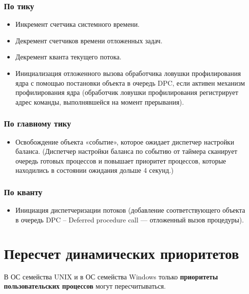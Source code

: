 \subsection*{По тику}
\begin{itemize}
	\item Инкремент счетчика системного времени.
	\item Декремент счетчиков времени отложенных задач.
	\item Декремент кванта текущего потока. %
	\item Инициализация отложенного вызова обработчика ловушки профилирования ядра с помощью постановки объекта в очередь DPC, если активен механизм профилирования ядра (обработчик ловушки профилирования регистрирует адрес команды, выполнявшейся на момент прерывания).
\end{itemize}

\subsection*{По главному тику}
\begin{itemize}
	\item Освобождение объекта «событие», которое ожидает диспетчер настройки баланса. (Диспетчер настройки баланса по событию от таймера сканирует очередь готовых процессов и повышает приоритет процессов, которые находились в состоянии ожидания дольше 4 секунд.)
\end{itemize}

\subsection*{По кванту}
\begin{itemize}
	\item Инициация диспетчеризации потоков (добавление соответствующего объекта в очередь DPC -- Deferred procedure call — отложенный вызов процедуры).
\end{itemize}

\chapter{Пересчет динамических приоритетов}

В ОС семейства UNIX и в ОС семейства Windows только \textbf{приоритеты пользовательских 	процессов} могут пересчитываться.
